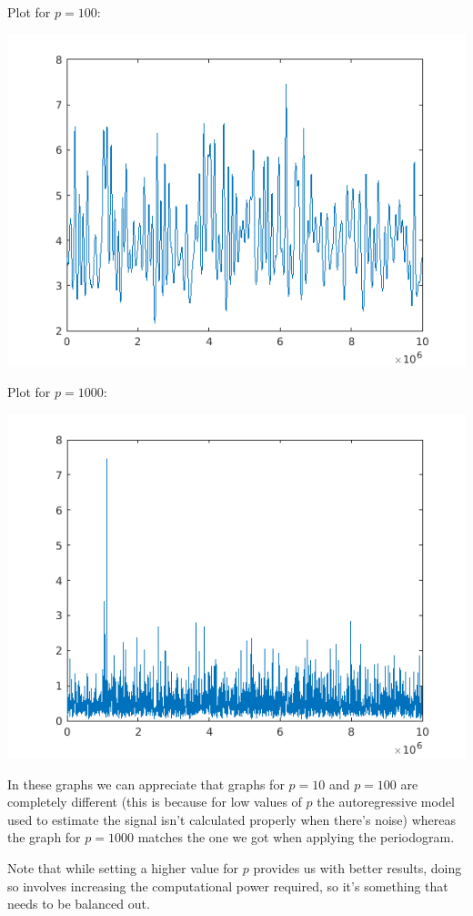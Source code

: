 \documentclass[conference,9pt]{IEEEtran}
\begin{document}
Plot for $p=100$:

\includegraphics[scale=0.6]{pn100}

Plot for $p=1000$:

\includegraphics[scale=0.6]{pn1000}

In these graphs we can appreciate that graphs for $p=10$ and $p=100$ are completely different (this is because for low values of $p$ the autoregressive model used to estimate the signal isn't calculated properly when there's noise) whereas the graph for $p=1000$ matches the one we got when applying the periodogram.

Note that while setting a higher value for $p$ provides us with better results, doing so involves increasing the computational power required, so it's something that needs to be balanced out.
\end{document}
